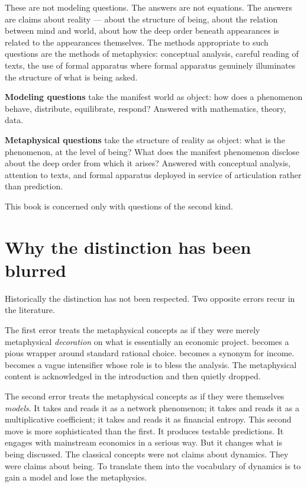 These are not modeling questions. The answers are not equations. The
answers are claims about reality --- about the structure of being, about
the relation between mind and world, about how the deep order beneath
appearances is related to the appearances themselves. The methods
appropriate to such questions are the methods of metaphysics:
conceptual analysis, careful reading of texts, the use of formal
apparatus where formal apparatus genuinely illuminates the structure of
what is being asked.

\begin{conceptbox}
\textbf{Modeling questions} take the manifest world as object: how does
a phenomenon behave, distribute, equilibrate, respond? Answered with
mathematics, theory, data.

\textbf{Metaphysical questions} take the structure of reality as object:
what is the phenomenon, at the level of being? What does the manifest
phenomenon disclose about the deep order from which it arises? Answered
with conceptual analysis, attention to texts, and formal apparatus
deployed in service of articulation rather than prediction.

This book is concerned only with questions of the second kind.
\end{conceptbox}

\section{Why the distinction has been blurred}
\label{sec:why-blurred}

Historically the distinction has not been respected. Two opposite errors
recur in the literature.

The first error treats the metaphysical concepts as if they were merely
metaphysical \emph{decoration} on what is essentially an economic
project.  becomes a pious wrapper around standard rational
choice.  becomes a synonym for income.  becomes
a vague intensifier whose role is to bless the analysis. The
metaphysical content is acknowledged in the introduction and then
quietly dropped.

The second error treats the metaphysical concepts as if they were
themselves \emph{models}. It takes  and reads it as a network
phenomenon; it takes  and reads it as a multiplicative
coefficient; it takes  and reads it as financial entropy.
This second move is more sophisticated than the first. It produces
testable predictions. It engages with mainstream economics in a serious
way. But it changes what is being discussed. The classical concepts
were not claims about dynamics. They were claims about being. To
translate them into the vocabulary of dynamics is to gain a model and
lose the metaphysics.

